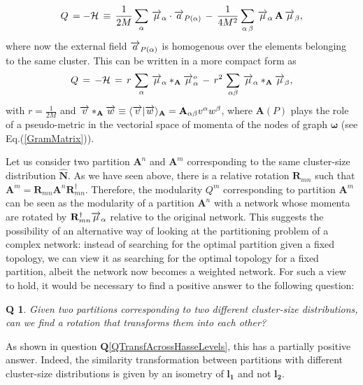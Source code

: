 \documentclass[twocolumn,aps,sort,nofootinbib]{revtex4}
\newtheorem{question}{Q}
\begin{document}
\begin{equation}
Q\,=-{\cal H}\,\equiv\,\frac{1}{2M}
\sum_{\alpha}\,\overrightarrow{\mu}_\alpha\cdot\overrightarrow{a}_{P(\alpha)}
\,-\,\frac{1}{4M^2}
\sum_{\alpha\,\beta}\,\overrightarrow{\mu}_\alpha\,\mathbf{A}\,\overrightarrow{\mu}_\beta,
\label{ModularityTopMomenta}
\end{equation}
where now the external field $\protect\overrightarrow{a}_{P(\alpha)}$ is 
homogenous over the elements belonging to the same cluster.
This can be written in a more compact form as
\begin{equation}
Q\,=\,-{\cal H}\,=\,r\,\sum_\alpha\,
\overrightarrow{\mu}_\alpha *_{\mathbf{A}} \overrightarrow{\mu}^o_\alpha\,-\,
r^2\,\sum_{\alpha\beta}\,
\overrightarrow{\mu}_\alpha *_{\mathbf{A}} \overrightarrow{\mu}_\beta,
\end{equation}
with $r=\frac{1}{2M}$ and 
$\overrightarrow{v}*_{\mathbf{A}}\protect\overrightarrow{w}\equiv
\langle\protect\overrightarrow{v}|\protect\overrightarrow{w}\rangle_{\mathbf{A}}
=\mathbf{A}_{\alpha\beta}v^\alpha w^\beta$,
where $\mathbf{A}(P)$ plays the role of a pseudo-metric 
in the vectorial space of momenta of the 
nodes of graph $\boldsymbol{\omega}$ (see Eq.(\ref{GramMatrix})).

Let us consider two partition $\mathbf{A}^n$ and $\mathbf{A}^m$ corresponding to
the same cluster-size distribution $\mathbf{\hat{N}}$. As we have
seen above, there is a relative rotation $\mathbf{R}_{mn}$ such that 
$\mathbf{A}^m=\mathbf{R}_{mn}\mathbf{A}^n\mathbf{R}_{mn}^\dagger$.
Therefore, the modularity $Q^m$ corresponding to partition $\mathbf{A}^m$
can be seen as the modularity of a partition $\mathbf{A}^n$ with
a network whose momenta are rotated by 
$\mathbf{R}_{mn}^\dagger\protect\overrightarrow{\mu}_\alpha$ 
relative to the original network.
This suggests the possibility of 
an alternative way of looking at the partitioning problem
of a complex network:
instead of searching for the optimal partition given a fixed
topology, we can view it as searching for the optimal topology
for a fixed partition, albeit the network now becomes a weighted
network. For such a view to hold, it would be necessary to find
a positive answer to the following question:
\begin{question}
Given two partitions
corresponding to two different cluster-size distributions,
can we find a rotation that transforms 
them into each other?
\end{question}
As shown in question $\boldsymbol{Q}$\ref{QTransfAcrossHasseLevels}, this has a partially positive answer.
Indeed, the similarity transformation between partitions with different cluster-size distributions
is given by an isometry of $\boldsymbol{l_1}$ and not $\boldsymbol{l_2}$.
\end{document}
